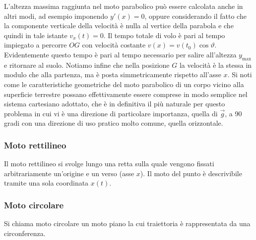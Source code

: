 \documentclass[10pt,a4paper]{book}
\begin{document}
L'altezza massima raggiunta nel moto parabolico può essere calcolata anche in altri modi, ad esempio imponendo $y'(x)=0$, oppure considerando il fatto che la componente verticale della velocità è nulla al vertice della parabola e che quindi in tale istante $v_x(t)=0$. Il tempo totale di volo è pari al tempo impiegato a percorre $OG$ con velocità costante $v(x)=v(t_0 )\cos\vartheta$. Evidentemente questo tempo è pari al tempo necessario per salire all'altezza $y_{\text{max}}$ e ritornare al suolo. Notiamo infine che nella posizione $G$ la velocità è la stessa in modulo che alla partenza, ma è posta simmetricamente rispetto all'asse $x$. Si noti come le caratteristiche geometriche del moto parabolico di un corpo vicino alla superficie terrestre possano effettivamente essere comprese in modo semplice nel sistema cartesiano adottato, che è in definitiva il più naturale per questo problema in cui vi è una direzione di particolare importanza, quella di $\vec{g}$, a 90 gradi con una direzione di uso pratico molto comune, quella orizzontale.

\subsubsection{Moto rettilineo}

Il moto rettilineo si svolge lungo una retta sulla quale vengono fissati arbitrariamente un'origine e un verso (asse $x$). Il moto del punto è descrivibile tramite una sola coordinata $x(t)$.

\subsubsection{Moto circolare}

Si chiama moto circolare un moto piano la cui traiettoria è rappresentata da una circonferenza.\\
\end{document}
